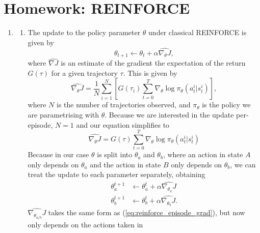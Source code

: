 \documentclass{article}
\begin{document}
\section*{Homework: REINFORCE}
\begin{enumerate}
	\item \begin{enumerate}
		      \item \label{8.4.1a} The update to the policy parameter  $\theta$ under classical
		            REINFORCE is given by
		            \begin{equation}\label{eq:policy_update}
			            \theta_{t+1} \leftarrow \theta_t + \alpha \widehat{\nabla_\theta J},
		            \end{equation}
		            where $\widehat{\nabla J}$ is an estimate of the gradient the expectation of the return
		            $G(\tau)$ for a given trajectory $\tau$. This is given by
		            \begin{equation}
			            \widehat{\nabla_\theta J} = \frac{1}{N} \sum^N_{i=1}\left[G(\tau_i)
				            \sum_{t=0}^T\nabla_\theta \log \pi_\theta (a_t^i | s_t^i)\right],
		            \end{equation}
		            where $N$ is the number of trajectories observed, and $\pi_\theta$ is the policy we
		            are parametrising with $\theta$. Because we are interested in the update
		            per-episode, $N=1$ and our equation simplifies to
		            \begin{equation}\label{eq:reinforce_episode_grad}
			            \widehat{\nabla_\theta J} = G(\tau) \sum_{t=0}^T\nabla_\theta \log \pi_\theta (a_t^i
			            | s_t^i)
		            \end{equation}
		            Because in our case $\theta$ is split into $\theta_a$ and $\theta_b$, where an
		            action in state $A$ only depends on $\theta_a$ and the action in state $B$ only
		            depends on $\theta_b$, we can treat the update to each parameter separately,
		            obtaining
		            \begin{align}
			            \theta^{t+1}_a & \leftarrow \theta^t_a + \alpha \widehat{\nabla_{\theta_a} J}  \\
			            \theta^{t+1}_b & \leftarrow \theta^t_b + \alpha \widehat{\nabla_{\theta_b} J}.
		            \end{align}
		            $\widehat{\nabla_{\theta_{a/b}}J}$ takes the same form as
		            (\ref{eq:reinforce_episode_grad}), but now only depends on the actions taken in

\end{enumerate}
\end{enumerate}
\end{document}
